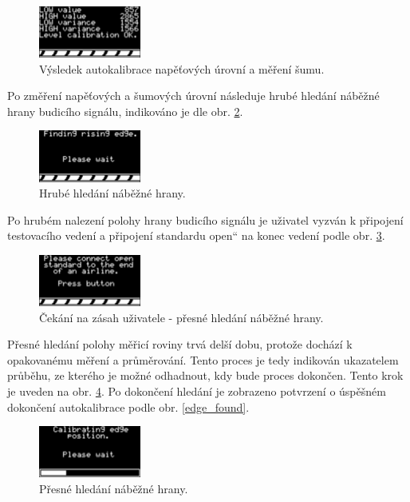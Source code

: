 \begin{figure}[H]
\includegraphics[width=0.3\textwidth,keepaspectratio,interpolate=false]{images/levels_complete.png}\caption{Výsledek autokalibrace napěťových úrovní a měření šumu.}\label{levels_complete}
\end{figure}

Po změření napěťových a šumových úrovní následuje hrubé hledání náběžné hrany budicího signálu, indikováno je dle obr. \ref{edge_wait}.
\begin{figure}[H]
\includegraphics[width=0.3\textwidth,keepaspectratio,interpolate=false]{images/edge_wait.png}\caption{Hrubé hledání náběžné hrany.}\label{edge_wait}
\end{figure}

Po hrubém nalezení polohy hrany budicího signálu je uživatel vyzván k připojení testovacího vedení a připojení standardu \quotedblbase open\textquotedblleft{} na konec vedení podle obr. \ref{edge_user_wait}.
\begin{figure}[H]
\includegraphics[width=0.3\textwidth,keepaspectratio,interpolate=false]{images/edge_user_wait.png}\caption{Čekání na zásah uživatele - přesné hledání náběžné hrany.}\label{edge_user_wait}
\end{figure}

Přesné hledání polohy měřicí roviny trvá delší dobu, protože dochází k opakovanému měření a průměrování. Tento proces je tedy indikován ukazatelem průběhu, ze kterého je možné odhadnout, kdy bude proces dokončen. Tento krok je uveden na obr. \ref{edge_sampling}. Po dokončení hledání je zobrazeno potvrzení o úspěšném dokončení autokalibrace podle obr. \ref{edge_found}.
\begin{figure}[H]
\includegraphics[width=0.3\textwidth,keepaspectratio,interpolate=false]{images/edge_sampling.png}\caption{Přesné hledání náběžné hrany.}\label{edge_sampling}
\end{figure}

